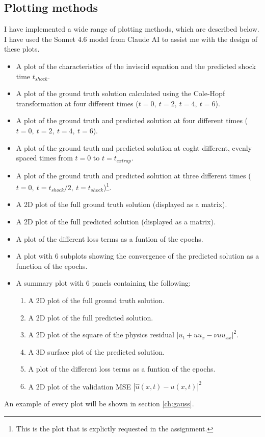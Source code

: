 \documentclass[we,twoside,openright,a4paper,11pt]{uantwerpenbamathesis}
\begin{document}
\subsection{Plotting methods}
I have implemented a wide range of plotting methods, which are described below.  I have used the Sonnet 4.6 model from Claude AI to assist me with the design of these plots. 
\begin{itemize}
    \item A plot of the characteristics of the inviscid equation and the predicted shock time $t_{shock}$.
    \item A plot of the ground truth solution calculated using the Cole-Hopf transformation at four different times ($t=0,\ t=2,\ t=4,\ t=6$).
    \item A plot of the ground truth and predicted solution at four different times ($t=0,\ t=2,\ t=4,\ t=6$).
    \item A plot of the ground truth and predicted solution at eoght different, evenly spaced times from $t=0$ to $t=t_{extrap}$.
    \item A plot of the ground truth and predicted solution at three different times ($t=0,\ t=t_{shock}/2,\ t=t_{shock}$)\footnote{This is the plot that is explictly requested in the assignment.}.
    \item A 2D plot of the full ground truth solution (displayed as a matrix).
    \item A 2D plot of the full predicted solution (displayed as a matrix).
    \item A plot of the different loss terms as a funtion of the epochs.
    \item A plot with 6 subplots showing the convergence of the predicted solution as a function of the epochs.
    \item A summary plot with 6 panels containing the following:
    \begin{enumerate}
        \item A 2D plot of the full ground truth solution.
        \item A 2D plot of the full predicted solution.
        \item A 2D plot of the square of the physics residual $|u_t+uu_x-\nu uu_{xx}|^2$.
        \item A 3D surface plot of the predicted solution.
        \item A plot of the different loss terms as a funtion of the epochs.
        \item A 2D plot of the validation MSE $|\hat u(x, t)-u(x, t)|^2$
    \end{enumerate}
\end{itemize}
An example of every plot will be shown in section \ref{ch:gauss}.
\end{document}

